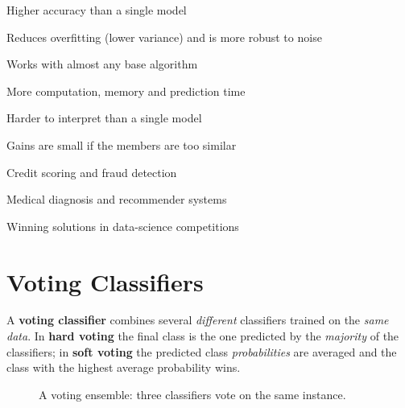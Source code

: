 {\item Higher accuracy than a single model
 \item Reduces overfitting (lower variance) and is more robust to noise
 \item Works with almost any base algorithm}
{\item More computation, memory and prediction time
 \item Harder to interpret than a single model
 \item Gains are small if the members are too similar}
{\item Credit scoring and fraud detection
 \item Medical diagnosis and recommender systems
 \item Winning solutions in data-science competitions}

\section{Voting Classifiers}


\begin{definition}
A \textbf{voting classifier} combines several \emph{different} classifiers trained on the \emph{same data}. In \textbf{hard voting} the final class is the one predicted by the \emph{majority} of the classifiers; in \textbf{soft voting} the predicted class \emph{probabilities} are averaged and the class with the highest average probability wins.
\end{definition}



\begin{figure}[!htbp]
\centering
{}
\caption{A voting ensemble: three classifiers vote on the same instance.}\label{fig:voting}
\end{figure}


